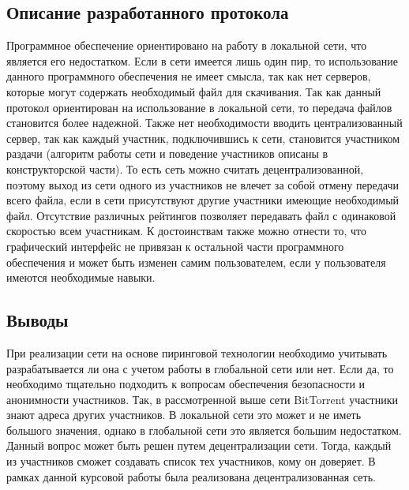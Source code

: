 \subsection{Описание разработанного протокола}\label{proto}
Программное обеспечение ориентировано на работу в локальной сети, что
является его недостатком. Если в сети имеется лишь один пир, то
использование данного программного обеспечения не имеет смысла, так как
нет серверов, которые могут содержать необходимый файл для скачивания.
\newpar
Так как данный протокол ориентирован на использование в локальной сети,
то передача файлов становится более надежной. Также нет необходимости
вводить централизованный сервер, так как каждый участник, подключившись
к сети, становится участником раздачи (алгоритм работы сети и поведение
участников описаны в конструкторской части). То есть сеть можно считать
децентрализованной, поэтому выход из сети одного из участников не влечет
за собой отмену передачи всего файла, если в сети присутствуют другие
участники имеющие необходимый файл. Отсутствие различных рейтингов
позволяет передавать файл с одинаковой скоростью всем участникам. К
достоинствам также можно отнести то, что графический интерфейс не
привязан к остальной части программного обеспечения и может быть
изменен самим пользователем, если у пользователя имеются необходимые
навыки.

\subsection*{Выводы}
При реализации сети на основе пиринговой технологии необходимо
учитывать разрабатывается ли она с учетом работы в глобальной сети или
нет. Если да, то необходимо тщательно подходить к вопросам обеспечения
безопасности и анонимности участников. Так, в рассмотренной выше сети
BitTorrent участники знают адреса других участников. В локальной сети это
может и не иметь большого значения, однако в глобальной сети это является
большим недостатком. Данный вопрос может быть решен путем
децентрализации сети. Тогда, каждый из участников сможет создавать список
тех участников, кому он доверяет. В рамках данной курсовой работы была
реализована децентрализованная сеть.
